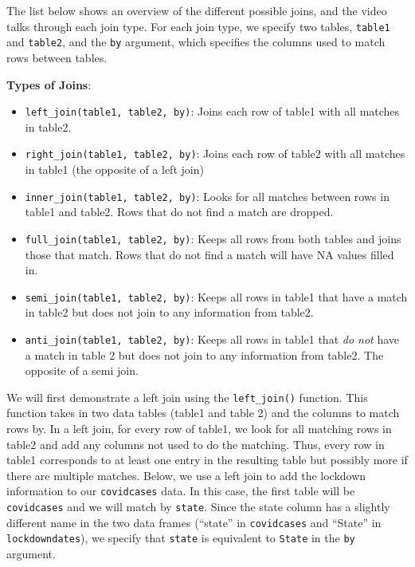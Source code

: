 \documentclass[
  letterpaper,
]{krantz}
\providecommand{\tightlist}{%
  \setlength{\itemsep}{0pt}\setlength{\parskip}{0pt}}\usepackage{longtable,booktabs,array}
\begin{document}
The list below shows an overview of the different possible joins, and
the video talks through each join type. For each join type, we specify
two tables, \texttt{table1} and \texttt{table2}, and the \texttt{by}
argument, which specifies the columns used to match rows between tables.

\textbf{Types of Joins}:

\begin{itemize}
\tightlist
\item
  \texttt{left\_join(table1,\ table2,\ by)}: Joins each row of table1
  with all matches in table2.\\
\item
  \texttt{right\_join(table1,\ table2,\ by)}: Joins each row of table2
  with all matches in table1 (the opposite of a left join)\\
\item
  \texttt{inner\_join(table1,\ table2,\ by)}: Looks for all matches
  between rows in table1 and table2. Rows that do not find a match are
  dropped.\\
\item
  \texttt{full\_join(table1,\ table2,\ by)}: Keeps all rows from both
  tables and joins those that match. Rows that do not find a match will
  have NA values filled in.\\
\item
  \texttt{semi\_join(table1,\ table2,\ by)}: Keeps all rows in table1
  that have a match in table2 but does not join to any information from
  table2.\\
\item
  \texttt{anti\_join(table1,\ table2,\ by)}: Keeps all rows in table1
  that \emph{do not} have a match in table 2 but does not join to any
  information from table2. The opposite of a semi join.
\end{itemize}

We will first demonstrate a left join using the \texttt{left\_join()}
function. This function takes in two data tables (table1 and table 2)
and the columns to match rows by. In a left join, for every row of
table1, we look for all matching rows in table2 and add any columns not
used to do the matching. Thus, every row in table1 corresponds to at
least one entry in the resulting table but possibly more if there are
multiple matches. Below, we use a left join to add the lockdown
information to our \texttt{covidcases} data. In this case, the first
table will be \texttt{covidcases} and we will match by \texttt{state}.
Since the state column has a slightly different name in the two data
frames (``state'' in \texttt{covidcases} and ``State'' in
\texttt{lockdowndates}), we specify that \texttt{state} is equivalent to
\texttt{State} in the \texttt{by} argument.
\end{document}
